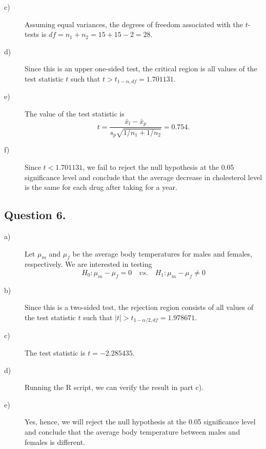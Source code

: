 \documentclass{article}\usepackage[]{graphicx}\usepackage[]{color}
\begin{document}
\begin{description}
\begin{description}
  \item[c)] Assuming equal variances, the degrees of freedom associated with the $t$-tests is $df = n_1 + n_2 = 15 + 15 - 2 = 28$.

  \item[d)] Since this is an upper one-sided test, the critical region is all values of the test statistic $t$ such that $t > t_{1 - \alpha, df} = 1.701131$.
    
  \item[e)] The value of the test statistic is
  \begin{equation*}
    t = \frac{\bar{x}_l - \bar{x}_p}{s_p\sqrt{1 / n_1 + 1 / n_2}} = 0.754.
  \end{equation*}
    
  \item[f)] Since $t < 1.701131$, we fail to reject the null hypothesis at the 0.05 significance level and conclude that the average decrease in cholesterol level is the same for each drug after taking for a year.
    
\end{description}


\subsection*{Question 6.}

\begin{description}
  
  \item[a)] Let $\mu_m$ and $\mu_f$ be the average body temperatures for males and females, respectively. We are interested in testing
  \begin{equation*}
    H_0: \mu_m - \mu_f = 0 \quad vs. \quad H_1: \mu_m - \mu_f \ne 0
  \end{equation*}
    
  \item[b)] Since this is a two-sided test, the rejection region consists of all values of the test statistic $t$ such that $|t| > t_{1-\alpha/2, df} = 1.978671$.
    
  \item[c)] The test statistic is $t = -2.285435$.

  \item[d)] Running the R script, we can verify the result in part c).
    
  \item[e)] Yes, hence, we will reject the null hypothesis at the 0.05 significance level and conclude that the average body temperature between males and females is different.
    

\end{description}
\end{description}
\end{document}
